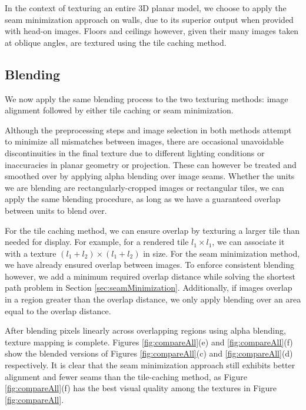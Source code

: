 \documentclass[10pt,twocolumn,letterpaper]{article}
\begin{document}
In the context of texturing an entire 3D planar model, we choose to
apply the seam minimization approach on walls, due to its superior
output when provided with head-on images. Floors and ceilings however,
given their many images taken at oblique angles, are textured using
the tile caching method.



\subsection{Blending}
\label{sec:blending}
We now apply the same blending process to the two texturing methods:
image alignment followed by either tile caching or seam minimization.

Although the preprocessing steps and image selection in both methods
attempt to minimize all mismatches between images, there are
occasional unavoidable discontinuities in the final texture due to
different lighting conditions or inaccuracies in planar geometry or
projection. These can however be treated and smoothed over by applying
alpha blending over image seams.  Whether the units we are blending
are rectangularly-cropped images or rectangular tiles, we can apply
the same blending procedure, as long as we have a guaranteed overlap
between units to blend over.

For the tile caching method, we can ensure overlap by texturing a
larger tile than needed for display. For example, for a rendered tile
$l_1 \times l_1$, we can associate it with a texture $(l_1 + l_2)
\times (l_1 + l_2)$ in size. For the seam minimization method, we have
already ensured overlap between images. To enforce consistent blending
however, we add a minimum required overlap distance while solving the
shortest path problem in Section
\ref{sec:seamMinimization}. Additionally, if images overlap in a
region greater than the overlap distance, we only apply blending over
an area equal to the overlap distance.

After blending pixels linearly across overlapping regions using alpha
blending, texture mapping is complete. Figures \ref{fig:compareAll}(e)
and \ref{fig:compareAll}(f) show the blended versions of Figures
\ref{fig:compareAll}(c) and \ref{fig:compareAll}(d) respectively. It
is clear that the seam minimization approach still exhibits better
alignment and fewer seams than the tile-caching method, as Figure
\ref{fig:compareAll}(f) has the best visual quality among the textures
in Figure \ref{fig:compareAll}.
\end{document}
